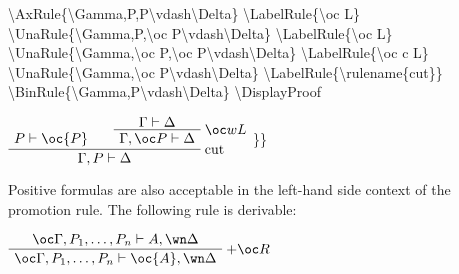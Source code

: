 \textbackslash{}AxRule\{\textbackslash{}Gamma,P,P\textbackslash{}vdash\textbackslash{}Delta\}
\textbackslash{}LabelRule\{\textbackslash{}oc L\}
\textbackslash{}UnaRule\{\textbackslash{}Gamma,P,\textbackslash{}oc
P\textbackslash{}vdash\textbackslash{}Delta\}
\textbackslash{}LabelRule\{\textbackslash{}oc L\}
\textbackslash{}UnaRule\{\textbackslash{}Gamma,\textbackslash{}oc
P,\textbackslash{}oc P\textbackslash{}vdash\textbackslash{}Delta\}
\textbackslash{}LabelRule\{\textbackslash{}oc c L\}
\textbackslash{}UnaRule\{\textbackslash{}Gamma,\textbackslash{}oc
P\textbackslash{}vdash\textbackslash{}Delta\}
\textbackslash{}LabelRule\{\textbackslash{}rulename\{cut\}\}
\textbackslash{}BinRule\{\textbackslash{}Gamma,P\textbackslash{}vdash\textbackslash{}Delta\}
\textbackslash{}DisplayProof

\(\AxRule{P\vdash\oc{P}}
\AxRule{\Gamma\vdash\Delta}
\LabelRule{\oc w L}
\UnaRule{\Gamma,\oc P\vdash\Delta}
\LabelRule{\rulename{cut}}
\BinRule{\Gamma,P\vdash\Delta}
\DisplayProof\) \}\}

Positive formulas are also acceptable in the left-hand side context of
the promotion rule. The following rule is derivable:

\(\AxRule{\oc\Gamma,P_1,\dots,P_n\vdash A,\wn\Delta}
\LabelRule{+ \oc R}
\UnaRule{\oc\Gamma,P_1,\dots,P_n\vdash \oc{A},\wn\Delta}
\DisplayProof\)

